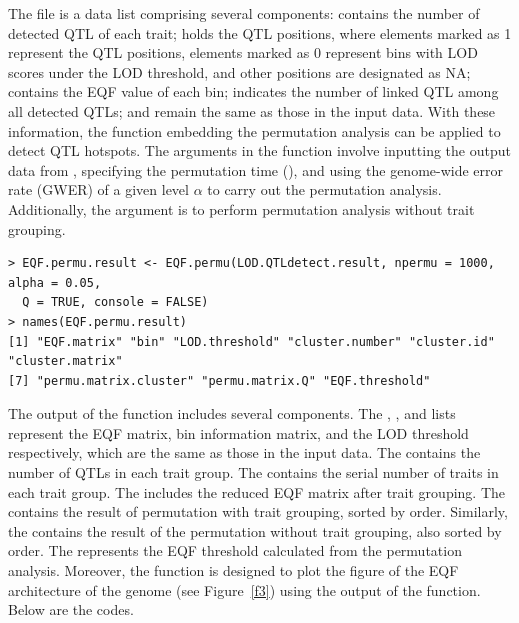 \noindent The  file is a data list comprising several components:  contains the number of detected QTL of each trait;  holds the QTL positions, where elements marked as 1 represent the QTL positions, elements marked as 0 represent bins with LOD scores under the LOD threshold, and other positions are designated as NA;  contains the EQF value of each bin;  indicates the number of linked QTL among all detected QTLs;  and  remain the same as those in the input data. With these information, the  function embedding the permutation analysis \citep[with trait grouping;][]{Wu-2021} can be applied to detect QTL hotspots. The arguments in the  function involve inputting the output data from , specifying the permutation time (), and using the genome-wide error rate (GWER) of a given level $\alpha$ to carry out the permutation analysis. Additionally, the  argument is to perform permutation analysis without trait grouping.

\begin{verbatim}
> EQF.permu.result <- EQF.permu(LOD.QTLdetect.result, npermu = 1000, alpha = 0.05, 
  Q = TRUE, console = FALSE)
> names(EQF.permu.result)
[1] "EQF.matrix" "bin" "LOD.threshold" "cluster.number" "cluster.id" "cluster.matrix"
[7] "permu.matrix.cluster" "permu.matrix.Q" "EQF.threshold"
\end{verbatim}

The output of the  function includes several components. The , , and  lists represent the EQF matrix, bin information matrix, and the LOD threshold respectively, which are the same as those in the input data. The  contains the number of QTLs in each trait group. The  contains the serial number of traits in each trait group. The  includes the reduced EQF matrix after trait grouping. The  contains the result of permutation with trait grouping, sorted by order. Similarly, the  contains the result of the permutation without trait grouping, also sorted by order. The  represents the EQF threshold calculated from the permutation analysis. Moreover, the  function is designed to plot the figure of the EQF architecture of the genome (see Figure~\ref{f3}) using the output of the  function. Below are the codes.

